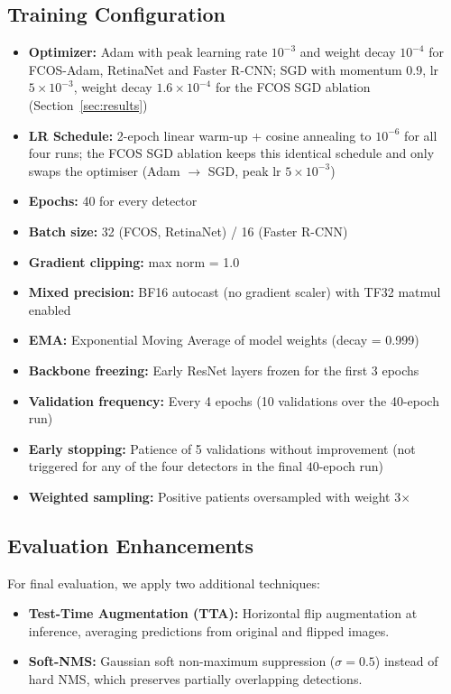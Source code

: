 \documentclass[11pt,a4paper]{article}
\begin{document}
\subsection{Training Configuration}

\begin{itemize}[nosep]
    \item \textbf{Optimizer:} Adam with peak learning rate $10^{-3}$ and weight decay $10^{-4}$ for FCOS-Adam, RetinaNet and Faster R-CNN; SGD with momentum $0.9$, lr $5\times 10^{-3}$, weight decay $1.6\times 10^{-4}$ for the FCOS SGD ablation (Section~\ref{sec:results})
    \item \textbf{LR Schedule:} 2-epoch linear warm-up + cosine annealing to $10^{-6}$ for all four runs; the FCOS SGD ablation keeps this identical schedule and only swaps the optimiser (Adam $\rightarrow$ SGD, peak lr $5\times10^{-3}$)
    \item \textbf{Epochs:} 40 for every detector
    \item \textbf{Batch size:} 32 (FCOS, RetinaNet) / 16 (Faster R-CNN)
    \item \textbf{Gradient clipping:} max norm = 1.0
    \item \textbf{Mixed precision:} BF16 autocast (no gradient scaler) with TF32 matmul enabled
    \item \textbf{EMA:} Exponential Moving Average of model weights (decay = 0.999)
    \item \textbf{Backbone freezing:} Early ResNet layers frozen for the first 3 epochs
    \item \textbf{Validation frequency:} Every 4 epochs (10 validations over the 40-epoch run)
    \item \textbf{Early stopping:} Patience of 5 validations without improvement (not triggered for any of the four detectors in the final $40$-epoch run)
    \item \textbf{Weighted sampling:} Positive patients oversampled with weight 3$\times$
\end{itemize}

\subsection{Evaluation Enhancements}

For final evaluation, we apply two additional techniques:
\begin{itemize}[nosep]
    \item \textbf{Test-Time Augmentation (TTA):} Horizontal flip augmentation at inference, averaging predictions from original and flipped images.
    \item \textbf{Soft-NMS:} Gaussian soft non-maximum suppression ($\sigma = 0.5$) instead of hard NMS, which preserves partially overlapping detections.
\end{itemize}
\end{document}
